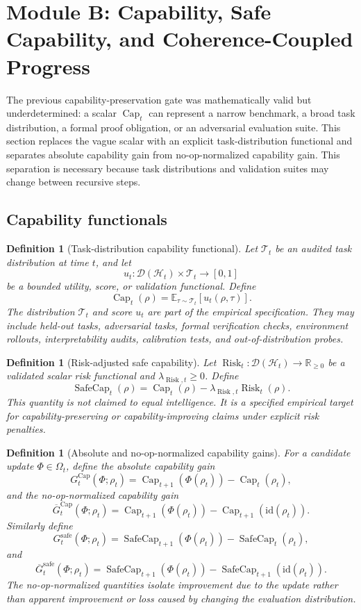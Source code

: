 \documentclass[11pt]{article}
\newtheorem{definition}[theorem]{Definition}
\newcommand{\D}{\mathcal{D}}
\newcommand{\Hcal}{\mathcal{H}}
\newcommand{\id}{\mathrm{id}}
\newcommand{\1}{\mathbf{1}}
\newcommand{\safe}{\mathrm{safe}}
\renewcommand{\Cap}{\operatorname{Cap}}
\newcommand{\Risk}{\operatorname{Risk}}
\providecommand{\Tcal}{\mathcal{T}}
\providecommand{\SafeCap}{\operatorname{SafeCap}}
\begin{document}
\section{Module B: Capability, Safe Capability, and Coherence-Coupled Progress}
\label{sec:capability_bridge}

The previous capability-preservation gate was mathematically valid but underdetermined: a scalar \(\Cap_t\) can represent a narrow benchmark, a broad task distribution, a formal proof obligation, or an adversarial evaluation suite.  This section replaces the vague scalar with an explicit task-distribution functional and separates absolute capability gain from no-op-normalized capability gain.  This separation is necessary because task distributions and validation suites may change between recursive steps.

\subsection{Capability functionals}

\begin{definition}[Task-distribution capability functional]
Let \(\Tcal_t\) be an audited task distribution at time \(t\), and let
\[
u_t:\D(\Hcal_t)\times\Tcal_t\to[0,1]
\]
be a bounded utility, score, or validation functional.  Define
\[
\Cap_t(\rho)
=
\mathbb E_{\tau\sim\Tcal_t}[u_t(\rho,\tau)].
\]
The distribution \(\Tcal_t\) and score \(u_t\) are part of the empirical specification.  They may include held-out tasks, adversarial tasks, formal verification checks, environment rollouts, interpretability audits, calibration tests, and out-of-distribution probes.
\end{definition}

\begin{definition}[Risk-adjusted safe capability]
Let \(\Risk_t:\D(\Hcal_t)\to\mathbb R_{\ge0}\) be a validated scalar risk functional and \(\lambda_{\Risk,t}\ge0\).  Define
\[
\SafeCap_t(\rho)
=
\Cap_t(\rho)-\lambda_{\Risk,t}\Risk_t(\rho).
\]
This quantity is not claimed to equal intelligence.  It is a specified empirical target for capability-preserving or capability-improving claims under explicit risk penalties.
\end{definition}

\begin{definition}[Absolute and no-op-normalized capability gains]
For a candidate update \(\Phi\in\Omega_t\), define the absolute capability gain
\[
G^{\Cap}_t(\Phi;\rho_t)
=
\Cap_{t+1}(\Phi(\rho_t))-\Cap_t(\rho_t),
\]
and the no-op-normalized capability gain
\[
\overline G^{\Cap}_t(\Phi;\rho_t)
=
\Cap_{t+1}(\Phi(\rho_t))-\Cap_{t+1}(\id(\rho_t)).
\]
Similarly define
\[
G^{\safe}_t(\Phi;\rho_t)
=
\SafeCap_{t+1}(\Phi(\rho_t))-\SafeCap_t(\rho_t),
\]
and
\[
\overline G^{\safe}_t(\Phi;\rho_t)
=
\SafeCap_{t+1}(\Phi(\rho_t))-\SafeCap_{t+1}(\id(\rho_t)).
\]
The no-op-normalized quantities isolate improvement due to the update rather than apparent improvement or loss caused by changing the evaluation distribution.
\end{definition}
\end{document}
